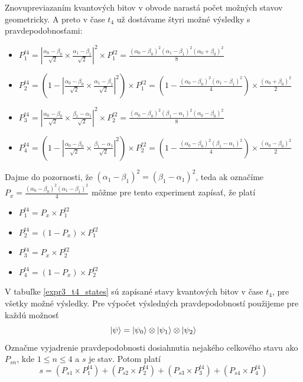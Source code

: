 Znovupreviazaním kvantových bitov v obvode narastá počet možných stavov
geometricky. A preto v čase \(t_4\) už dostávame štyri možné výsledky s 
pravdepodobnosťami:
\begin{itemize}
    \item[] \(P^{t4}_1 = |\frac{\alpha_0 - \beta_0}{\sqrt{2}} \times \frac{\alpha_1 - \beta_1}{\sqrt{2}}|^2 \times P^{t2}_1 = \frac{(\alpha_0 - \beta_0)^2(\alpha_1-\beta_1)^2(\alpha_0+\beta_0)^2}{8}\)

    \item[] \(P^{t4}_2 = (1-|\frac{\alpha_0 - \beta_0}{\sqrt{2}} \times \frac{\alpha_1 - \beta_1}{\sqrt{2}}|^2) \times P^{t2}_1 = (1-\frac{(\alpha_0 - \beta_0)^2(\alpha_1-\beta_1)^2}{4}) \times \frac{(\alpha_0+\beta_0)^2}{2}\)

    \item[] \(P^{t4}_3 = |\frac{\alpha_0 - \beta_0}{\sqrt{2}} \times \frac{\beta_1 - \alpha_1}{\sqrt{2}}|^2 \times P^{t2}_2 = \frac{(\alpha_0 - \beta_0)^2(\beta_1-\alpha_1)^2(\alpha_0-\beta_0)^2}{8}\)

    \item[] \(P^{t4}_4 = (1-|\frac{\alpha_0 - \beta_0}{\sqrt{2}} \times \frac{\beta_1 - \alpha_1}{\sqrt{2}}|^2) \times P^{t2}_2 = (1-\frac{(\alpha_0 - \beta_0)^2(\beta_1-\alpha_1)^2}{4}) \times \frac{(\alpha_0-\beta_0)^2}{2}\)
\end{itemize}

Dajme do pozornosti, že \((\alpha_1 - \beta_1)^2 = (\beta_1 - \alpha_1)^2\),
teda ak označíme \(P_x = \frac{(\alpha_0 - \beta_0)^2(\alpha_1-\beta_1)^2}{4}\)
môžme pre tento experiment zapísať, že platí

\begin{itemize}
    \item[] \(P^{t4}_1 = P_x \times P^{t2}_1\)

    \item[] \(P^{t4}_2 = (1-P_x) \times P^{t2}_1\)

    \item[] \(P^{t4}_3 = P_x \times P^{t2}_2\)  

    \item[] \(P^{t4}_4 = (1-P_x) \times P^{t2}_2\)
\end{itemize}

V tabuľke \ref{expr3_t4_states} sú zapísané stavy kvantových bitov v čase
\(t_4\), pre všetky možné výsledky. Pre výpočet výsledných pravdepodobností
použijeme pre každú možnosť
\[\ket{\psi} = \ket{\psi_0} \otimes \ket{\psi_1} \otimes \ket{\psi_2}\]
Označme vyjadrenie pravdepodobnosti dosiahnutia nejakého celkového stavu 
ako \(P_{sn}\), kde \(1 \leq n \leq 4\) a \(s\) je stav. Potom platí
\[s = (P_{s1} \times P^{t4}_1) + (P_{s2} \times P^{t4}_2) + (P_{s3} \times P^{t4}_3) + (P_{s4} \times P^{t4}_4)\]

